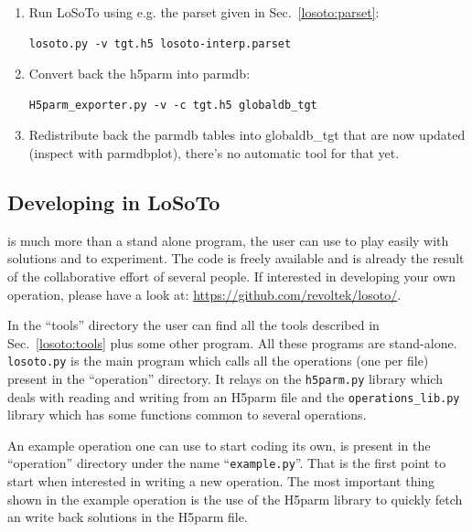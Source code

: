 \begin{enumerate}
\item Run LoSoTo using e.g. the parset given in Sec.~\ref{losoto:parset}:
\begin{verbatim}
losoto.py -v tgt.h5 losoto-interp.parset
\end{verbatim}

\item Convert back the h5parm into parmdb:
\begin{verbatim}
H5parm_exporter.py -v -c tgt.h5 globaldb_tgt
\end{verbatim}

\item Redistribute back the parmdb tables into globaldb\_tgt that are now updated (inspect with parmdbplot), there's no automatic tool for that yet.
\end{enumerate}

\subsection{Developing in LoSoTo}
\label{losoto:developing}
\losoto{} is much more than a stand alone program, the user can use \losoto{} to play easily with solutions and to experiment. The code is freely available and is already the result of the collaborative effort of several people. If interested in developing your own operation, please have a look at: \url{https://github.com/revoltek/losoto/}.

In the ``tools'' directory the user can find all the tools described in Sec.~\ref{losoto:tools} plus some other program. All these programs are stand-alone. \texttt{losoto.py} is the main program which calls all the operations (one per file) present in the ``operation'' directory. It relays on the \texttt{h5parm.py} library which deals with reading and writing from an H5parm file and the \texttt{operations\_lib.py} library which has some functions common to several operations.

An example operation one can use to start coding its own, is present in the ``operation'' directory under the name ``\texttt{example.py}''. That is the first point to start when interested in writing a new operation. The most important thing shown in the example operation is the use of the H5parm library to quickly fetch an write back solutions in the H5parm file.






